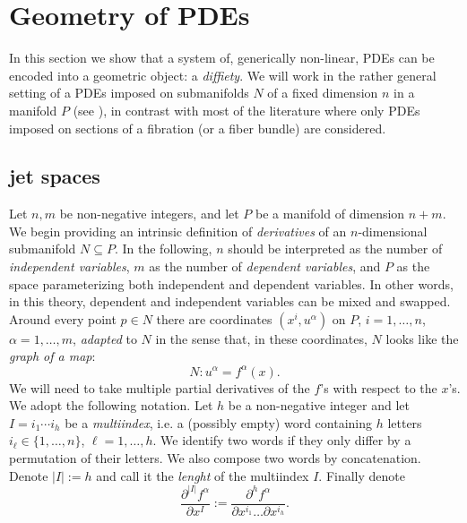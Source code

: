 \documentclass{conm-p-l}
\theoremstyle{definition}
\theoremstyle{remark}
\numberwithin{equation}{section}
\begin{document}
\tableofcontents

\section{Geometry of PDEs}\label{Sec:Geom}

In this section we show that a system of, generically non-linear, PDEs can be encoded into a geometric object: a \emph{diffiety}. We will work in the rather general setting of a PDEs imposed on submanifolds $N$ of a fixed dimension $n$ in a manifold $P$ (see \cite{klv86}), in contrast with most of the literature where only PDEs imposed on sections of a fibration (or a fiber bundle) are considered.

\subsection{jet spaces}
Let $n,m$ be non-negative integers, and let $P$ be a manifold of dimension $n + m$. We begin providing an intrinsic definition of \emph{derivatives} of an $n$-dimensional submanifold $N \subseteq P$. In the following, $n$ should be interpreted as the number of \emph{independent variables}, $m$ as the number of \emph{dependent variables}, and $P$ as the space parameterizing both independent and dependent variables. In other words, in this theory, dependent and independent variables can be mixed and swapped. Around every point $p \in N$ there are coordinates $(x^i, u^\alpha)$ on $P$, $i = 1, \ldots, n$, $\alpha = 1,\ldots, m$, \emph{adapted} to $N$ in the sense that, in these coordinates, $N$ looks like the \emph{graph of a map}:
\begin{equation}\label{eq:N_loc}
N :  u^\alpha = f^\alpha (x)  .
\end{equation}
We will need to take multiple partial derivatives of the $f$'s with respect to the $x$'s. We adopt the following notation. Let $h$ be a non-negative integer and let $I = i_1\cdots i_h$ be a \emph{multiindex}, i.e.{} a (possibly empty) word containing $h$ letters $i_\ell \in \{1, \ldots, n\}$, $\ell = 1, \ldots, h$. We identify two words if they only differ by a permutation of their letters. We also compose two words by concatenation. Denote $|I| := h$ and call it the \emph{lenght} of the multiindex $I$. Finally denote
\[
\frac{\partial^{|I|} f^\alpha}{\partial x^I} := \frac{\partial^h f^\alpha}{\partial x^{i_1} \ldots \partial x^{i_h}}.
\] 
\end{document}
